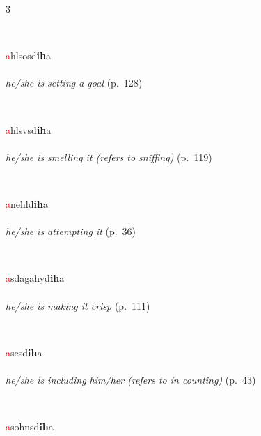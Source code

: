 \documentclass[oneside,openany]{book}%
\begin{document}
\begin{multicols}{3}
\begin{minipage}[t]{\linewidth}
\end{minipage}\\[1em]%
\begin{minipage}[t]{\linewidth}
\raggedright\noindent \textcolor{Red}{a}hlsosd\textbf{ih}a\\
\\
\noindent \textit{he/she is setting a goal} (p.~128)
\end{minipage}\\[1em]%
\begin{minipage}[t]{\linewidth}
\raggedright\noindent \textcolor{Red}{a}hlsvsd\textbf{ih}a\\
\\
\noindent \textit{he/she is smelling it (refers to sniffing)} (p.~119)
\end{minipage}\\[1em]%
\begin{minipage}[t]{\linewidth}
\raggedright\noindent \textcolor{Red}{a}nehld\textbf{ih}a\\
\\
\noindent \textit{he/she is attempting it} (p.~36)
\end{minipage}\\[1em]%
\begin{minipage}[t]{\linewidth}
\raggedright\noindent \textcolor{Red}{a}sdagahyd\textbf{ih}a\\
\\
\noindent \textit{he/she is making it crisp} (p.~111)
\end{minipage}\\[1em]%
\begin{minipage}[t]{\linewidth}
\raggedright\noindent \textcolor{Red}{a}sesd\textbf{ih}a\\
\\
\noindent \textit{he/she is including him/her (refers to in counting)} (p.~43)
\end{minipage}\\[1em]%
\begin{minipage}[t]{\linewidth}
\raggedright\noindent \textcolor{Red}{a}sohnsd\textbf{ih}a\\
\\

\end{minipage}
\end{multicols}
\end{document}
